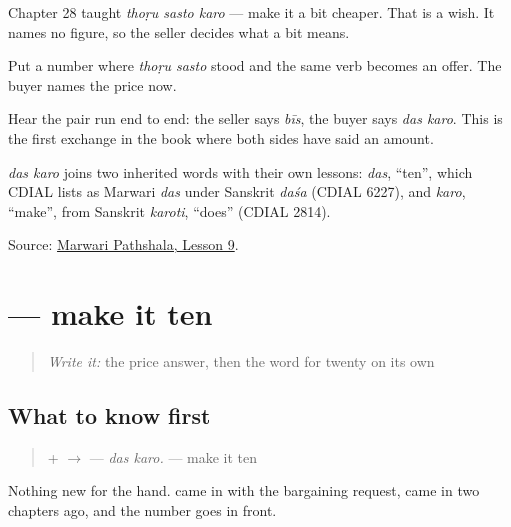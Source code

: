Chapter 28 taught \emph{thoṛu sasto karo} — make it a bit cheaper. That is a wish. It names no figure, so the seller decides what a bit means.

Put a number where \emph{thoṛu sasto} stood and the same verb becomes an offer. The buyer names the price now.

Hear the pair run end to end: the seller says \emph{bīs}, the buyer says \emph{das karo}. This is the first exchange in the book where both sides have said an amount.

\begin{cousinweb}
\emph{das karo} joins two inherited words with their own lessons: \emph{das}, \textquotedblleft{}ten\textquotedblright{}, which CDIAL lists as Marwari \emph{das} under Sanskrit \emph{daśa} (CDIAL 6227), and \emph{karo}, \textquotedblleft{}make\textquotedblright{}, from Sanskrit \emph{karoti}, \textquotedblleft{}does\textquotedblright{} (CDIAL 2814).
\end{cousinweb}

\begin{tcolorbox}[breakable,colback=teal!4,colframe=teal!35!black,title={Before you move on}]
Source: \href{https://www.marwaripathshala.com/marwari-lesson-9-english}{Marwari Pathshala, Lesson 9}.
\end{tcolorbox}
\section[\texorpdfstring{\mw{दस} \mw{करो।} (das karo.)}{दस करो। (das karo.)}]{  — make it ten}

\label{lesson:MW-C34-counter-offer}



\begin{quote}
\emph{Write it:} the price answer, then the word for twenty on its own
\end{quote}

\subsection*{What to know first}
\begin{quote}
\textbf{} + \textbf{} $\to$ \textbf{ } — \emph{das karo.} — make it ten
\end{quote}

Nothing new for the hand. \textbf{} came in with the bargaining request, \textbf{} came in two chapters ago, and the number goes in front.

